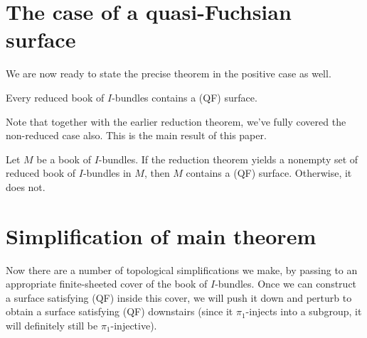 \section{The case of a quasi-Fuchsian surface}

We are now ready to state the precise theorem in the positive case as well.

\begin{thm}

Every reduced book of $I$-bundles contains a (QF) surface.

\end{thm}

Note that together with the earlier reduction theorem, we've fully covered the
non-reduced case also. This is the main result of this paper.

\begin{thm}

Let $M$ be a book of $I$-bundles. If the reduction theorem yields a nonempty
set of reduced book of $I$-bundles in $M$, then $M$ contains a (QF) surface.
Otherwise, it does not.

\end{thm}

\section{Simplification of main theorem}

Now there are a number of topological simplifications we make, by passing to an
appropriate finite-sheeted cover of the book of $I$-bundles.  Once we can
construct a surface satisfying (QF) inside this cover, we will push it down and
perturb to obtain a surface satisfying (QF) downstairs (since it
$\pi_1$-injects into a subgroup, it will definitely still be
$\pi_1$-injective).

